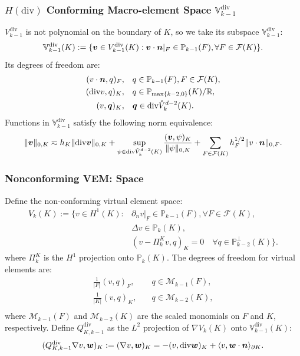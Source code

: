 \documentclass[notheorems,serif]{beamer}
\begin{document}
\begin{CJK}{UTF8}{gkai}
\begin{frame}
    \frametitle{$H(\mathrm{div})$ Conforming Macro-element Space $\mathbb{V}^{\mathrm{div}}_{k-1}$}
    $V^{\mathrm{div}}_{k-1}$ is not polynomial on the boundary of $K$, so we take its subspace 
    $\mathbb{V}^{\mathrm{div}}_{k-1}$:
    $$
    \mathbb{V}^{\mathrm{div}}_{k-1}(K) := \{\boldsymbol{v} \in
        V^{\mathrm{div}}_{k-1}(K) :
        \boldsymbol{v} \cdot \boldsymbol{n}|_F \in \mathbb{P}_{k-1}(F),
    \forall F \in \mathcal{F}(K)\}.
    $$
    Its degrees of freedom are:
    $$
    \begin{aligned}
        (v\cdot\boldsymbol{n},q)_{F}, & \quad
        q \in \mathbb{P}_{k-1}(F), F \in \mathcal{F}(K), \\
        (\mathrm{div} v, q)_{K}, & \quad q \in \mathbb{P}_{\max\{k-2, 0\}}(K)/\mathbb{R}, \\
        (v, \boldsymbol{q})_K, & \quad
        \boldsymbol{q} \in \mathrm{div} \mathring{V}_k^{d-2}(K).
    \end{aligned}
    $$
    Functions in $\mathbb{V}_{k-1}^{\mathrm{div}}$ satisfy the following norm equivalence:
    $$
    \|\boldsymbol{v}\|_{0, K} \eqsim h_K\|\mathrm{div} \boldsymbol{v}\|_{0, K} + 
    \sup_{\psi \in \mathrm{div} \mathring{V}_k^{d-2}(K)}\frac{(\boldsymbol{v},
    \psi)_K}{\|\psi\|_{0, K}} + \sum_{F \in \mathcal{F}(K)}h_F^{1/2}\|v\cdot
    \boldsymbol{n}\|_{0, F}.
    $$
\end{frame}

\begin{frame}
\frametitle{Nonconforming VEM: Space}
Define the non-conforming virtual element space:
$$
\begin{aligned}
    V_k(K) := \{v \in H^1(K): & \partial_n v|_{F} \in \mathbb{P}_{k-1}(F), 
        \forall F \in \mathcal{F}(K), \\
    & \Delta v \in \mathbb{P}_{k}(K),\\
    & (v-\Pi_k^K v, q)_K = 0 \quad \forall q \in
    \mathbb{P}_{k-2}^{\perp}(K)\}.
\end{aligned}
$$
where $\Pi_k^K$ is the $H^1$ projection onto $\mathbb{P}_k(K)$.
The degrees of freedom for virtual elements are:
$$
\begin{aligned}
    \frac{1}{|F|}(v, q)_{F}, & \quad q \in \mathcal{M}_{k-1}(F), \\
    \frac{1}{|K|}(v, q)_{K}, & \quad q \in \mathcal{M}_{k-2}(K), \\
\end{aligned}
$$
where $\mathcal{M}_{k-1}(F)$ and $\mathcal{M}_{k-2}(K)$ are the scaled monomials on $F$ and $K$, respectively.
Define $Q_{K, k-1}^{\mathrm{div}}$ as the $L^2$ projection of $\nabla V_k(K)$ onto
$\mathbb{V}^{\mathrm{div}}_{k-1}(K)$:
$$
(Q_{K, k-1}^{\mathrm{div}}\nabla v, \boldsymbol{w})_K := (\nabla v,
\boldsymbol{w})_K = -(v, \mathrm{div} \boldsymbol{w})_K + \langle v, \boldsymbol{w} 
\cdot \boldsymbol{n}\rangle_{\partial K}.
$$
\end{frame}


\end{CJK}
\end{document}

